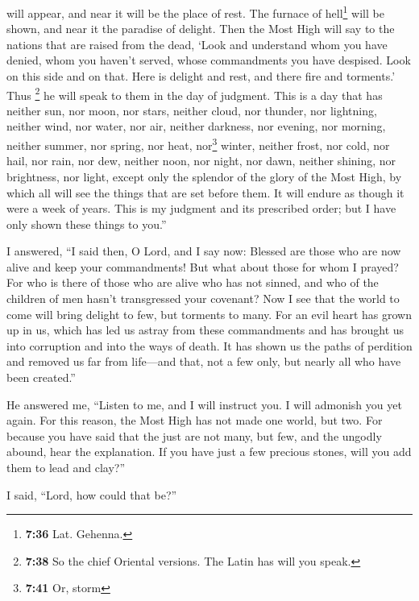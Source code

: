 will appear, and near it will be the place of rest. The furnace of
hell\footnote{\textbf{7:36} Lat. Gehenna.} will be shown, and near it
the paradise of delight.  Then the Most High will say to
the nations that are raised from the dead, `Look and understand whom you
have denied, whom you haven't served, whose commandments you have
despised.  Look on this side and on that. Here is delight
and rest, and there fire and torments.' Thus \footnote{\textbf{7:38} So
  the chief Oriental versions. The Latin has will you speak.} he will
speak to them in the day of judgment.  This is a day that
has neither sun, nor moon, nor stars,  neither cloud, nor
thunder, nor lightning, neither wind, nor water, nor air, neither
darkness, nor evening, nor morning,  neither summer, nor
spring, nor heat, nor\footnote{\textbf{7:41} Or, storm} winter, neither
frost, nor cold, nor hail, nor rain, nor dew,  neither
noon, nor night, nor dawn, neither shining, nor brightness, nor light,
except only the splendor of the glory of the Most High, by which all
will see the things that are set before them.  It will
endure as though it were a week of years.  This is my
judgment and its prescribed order; but I have only shown these things to
you.''

 I answered, ``I said then, O Lord, and I say now:
Blessed are those who are now alive and keep your commandments!
 But what about those for whom I prayed? For who is there
of those who are alive who has not sinned, and who of the children of
men hasn't transgressed your covenant?  Now I see that
the world to come will bring delight to few, but torments to many.
 For an evil heart has grown up in us, which has led us
astray from these commandments and has brought us into corruption and
into the ways of death. It has shown us the paths of perdition and
removed us far from life---and that, not a few only, but nearly all who
have been created.''

 He answered me, ``Listen to me, and I will instruct you.
I will admonish you yet again.  For this reason, the Most
High has not made one world, but two.  For because you
have said that the just are not many, but few, and the ungodly abound,
hear the explanation.  If you have just a few precious
stones, will you add them to lead and clay?''

 I said, ``Lord, how could that be?''

